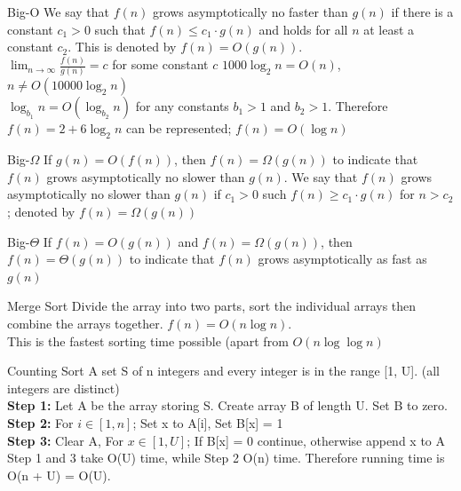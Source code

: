 \documentclass{lecture}
\begin{document}
\begin{landscape}
\begin{multicols}{2}
    \begin{note}{Big-O}
        We say that $f(n)$ grows asymptotically no faster than $g(n)$ if there is a constant $c_1>0$ such that $f(n)\leq c_1\cdot g(n)$ and holds for all $n$ at least a constant $c_2$. This is denoted by $f(n)=O(g(n))$.\\
        $\lim_{n\rightarrow\infty}\frac{f(n)}{g(n)}=c$ for some constant $c$
        $1000\log_2n=O(n)$,\\$n\neq O(10000\log_2n)$\\
        $\log_{b_1}n=O(\log_{b_2}n)$ for any constants $b_1>1$ and $b_2>1$.
        Therefore $f(n)=2+6\log_2n$ can be represented; $f(n)=O(\log n)$
    \end{note}
    \vfill
    \begin{note}{Big-$\Omega$}
        If $g(n)=O(f(n))$, then $f(n)=\Omega(g(n))$ to indicate that $f(n)$ grows asymptotically no slower than $g(n)$. We say that $f(n)$ grows asymptotically no slower than $g(n)$ if $c_1>0$ such $f(n)\geq c_1\cdot g(n)$ for $n>c_2$; denoted by $f(n)=\Omega(g(n))$
    \end{note}
    \vfill
    \begin{note}{Big-$\Theta$}
        If $f(n)=O(g(n))$ and $f(n)=\Omega(g(n))$, then $f(n)=\Theta(g(n))$ to indicate that $f(n)$ grows asymptotically as fast as $g(n)$
    \end{note}

    \vspace{1em}
    \begin{note}{Merge Sort}
        Divide the array into two parts, sort the individual arrays then combine the arrays together. $f(n)=O(n\log n)$.\\
        This is the fastest sorting time possible (apart from $O(n\log\log n)$
    \end{note}
    \vfill
    \begin{note}{Counting Sort}
        A set S of n integers and every integer is in the range [1, U]. (all integers are distinct)\\
        \textbf{Step 1:} Let A be the array storing S. Create array B of length U. Set B to zero.\\
        \textbf{Step 2:} For $i\in [1,n]$; Set x to A[i], Set B[x] = 1\\
        \textbf{Step 3:} Clear A, For $x\in[1,U]$; If B[x] = 0 continue, otherwise append x to A
        Step 1 and 3 take O(U) time, while Step 2 O(n) time. Therefore running time is O(n + U) = O(U).
    \end{note}
    \vfill


\end{multicols}
\end{landscape}
\end{document}
